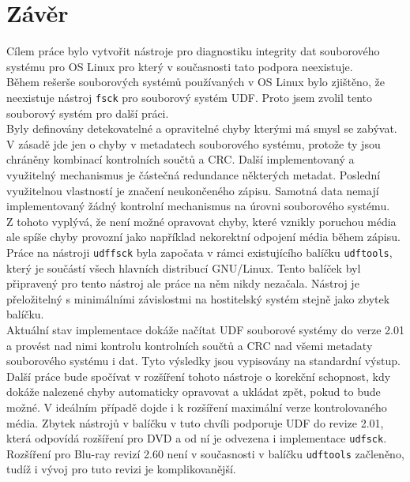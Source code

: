 \chapter{Závěr}
Cílem práce bylo vytvořit nástroje pro diagnostiku integrity dat souborového systému pro OS Linux pro který v současnosti tato podpora neexistuje.\\
Během rešerše souborových systémů používaných v OS Linux bylo zjištěno, že neexistuje nástroj \texttt{fsck} pro souborový systém UDF. Proto jsem zvolil tento souborový systém pro další práci.\\
Byly definovány detekovatelné a opravitelné chyby kterými má smysl se zabývat. V zásadě jde jen o chyby v metadatech souborového systému, protože ty jsou chráněny kombinací kontrolních součtů a CRC. Další implementovaný a využitelný mechanismus je částečná redundance některých metadat. Poslední využitelnou vlastností je značení neukončeného zápisu. Samotná data nemají implementovaný žádný kontrolní mechanismus na úrovni souborového systému.\\
Z tohoto vyplývá, že není možné opravovat chyby, které vznikly poruchou média ale spíše chyby provozní jako například nekorektní odpojení média během zápisu.\\
Práce na nástroji \texttt{udffsck} byla započata v rámci existujícího balíčku \texttt{udftools}, který je součástí všech hlavních distribucí GNU/Linux. Tento balíček byl připravený pro tento nástroj ale práce na něm nikdy nezačala. Nástroj je přeložitelný s minimálními závislostmi na hostitelský systém stejně jako zbytek balíčku.\\
Aktuální stav implementace dokáže načítat UDF souborové systémy do verze 2.01 a provést nad nimi kontrolu kontrolních součtů a CRC nad všemi metadaty souborového systému i dat. Tyto výsledky jsou vypisovány na standardní výstup.\\
Další práce bude spočívat v rozšíření tohoto nástroje o korekční schopnost, kdy dokáže nalezené chyby automaticky opravovat a ukládat zpět, pokud to bude možné. V ideálním případě dojde i k rozšíření maximální verze kontrolovaného média. Zbytek nástrojů v balíčku v tuto chvíli podporuje UDF do revize 2.01, která odpovídá rozšíření pro DVD a od ní je odvezena i implementace \texttt{udfsck}. Rozšíření pro Blu-ray revizí 2.60 není v současnosti v balíčku \texttt{udftools} začleněno, tudíž i vývoj pro tuto revizi je komplikovanější. 
